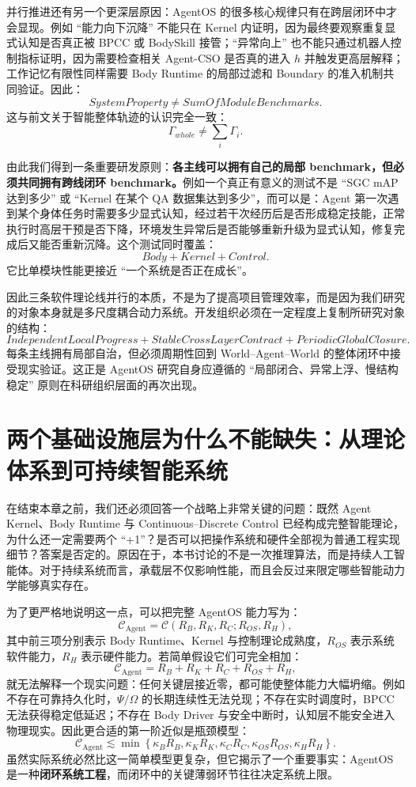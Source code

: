 并行推进还有另一个更深层原因：AgentOS 的很多核心规律只有在跨层闭环中才会显现。例如 ``能力向下沉降'' 不能只在 Kernel 内证明，因为最终要观察重复显式认知是否真正被 BPCC 或 BodySkill 接管；``异常向上'' 也不能只通过机器人控制指标证明，因为需要检查相关 Agent-CSO 是否真的进入 $h$ 并触发更高层解释；工作记忆有限性同样需要 Body Runtime 的局部过滤和 Boundary 的准入机制共同验证。因此：
\[
\boxed{
SystemProperty
\neq
SumOfModuleBenchmarks.
}
\]
这与前文关于智能整体轨迹的认识完全一致：
\[
\Gamma_{whole}
\neq
\sum_i \Gamma_i.
\]

由此我们得到一条重要研发原则：\textbf{各主线可以拥有自己的局部 benchmark，但必须共同拥有跨线闭环 benchmark。}例如一个真正有意义的测试不是 ``SGC mAP 达到多少'' 或 ``Kernel 在某个 QA 数据集达到多少''，而可以是：Agent 第一次遇到某个身体任务时需要多少显式认知，经过若干次经历后是否形成稳定技能，正常执行时高层干预是否下降，环境发生异常后是否能够重新升级为显式认知，修复完成后又能否重新沉降。这个测试同时覆盖：
\[
Body
+
Kernel
+
Control.
\]
它比单模块性能更接近 ``一个系统是否正在成长''。

因此三条软件理论线并行的本质，不是为了提高项目管理效率，而是因为我们研究的对象本身就是多尺度耦合动力系统。开发组织必须在一定程度上复制所研究对象的结构：
\[
\boxed{
IndependentLocalProgress
+
StableCrossLayerContract
+
PeriodicGlobalClosure.
}
\]
每条主线拥有局部自治，但必须周期性回到 World--Agent--World 的整体闭环中接受现实验证。这正是 AgentOS 研究自身应遵循的 ``局部闭合、异常上浮、慢结构稳定'' 原则在科研组织层面的再次出现。

\section{两个基础设施层为什么不能缺失：从理论体系到可持续智能系统}
\label{sec:roadmap-two-plus-one-necessity}

在结束本章之前，我们还必须回答一个战略上非常关键的问题：既然 Agent Kernel、Body Runtime 与 Continuous--Discrete Control 已经构成完整智能理论，为什么还一定需要两个 ``+1''？是否可以把操作系统和硬件全部视为普通工程实现细节？答案是否定的。原因在于，本书讨论的不是一次推理算法，而是持续人工智能体。对于持续系统而言，承载层不仅影响性能，而且会反过来限定哪些智能动力学能够真实存在。

为了更严格地说明这一点，可以把完整 AgentOS 能力写为：
\[
\mathcal C_{\mathrm{Agent}}
=
\mathcal C
\left(
R_B,
R_K,
R_C;
R_{OS},
R_H
\right),
\]
其中前三项分别表示 Body Runtime、Kernel 与控制理论成熟度，$R_{OS}$ 表示系统软件能力，$R_H$ 表示硬件能力。若简单假设它们可完全相加：
\[
\mathcal C_{\mathrm{Agent}}
=
R_B+R_K+R_C+R_{OS}+R_H,
\]
就无法解释一个现实问题：任何关键层接近零，都可能使整体能力大幅坍缩。例如不存在可靠持久化时，$\Psi/\Omega$ 的长期连续性无法兑现；不存在实时调度时，BPCC 无法获得稳定低延迟；不存在 Body Driver 与安全中断时，认知层不能安全进入物理现实。因此更合适的第一阶近似是瓶颈模型：
\[
\boxed{
\mathcal C_{\mathrm{Agent}}
\lesssim
\min
\left\{
\kappa_B R_B,
\kappa_K R_K,
\kappa_C R_C,
\kappa_{OS}R_{OS},
\kappa_HR_H
\right\}.
}
\]
虽然实际系统必然比这一简单模型更复杂，但它揭示了一个重要事实：AgentOS 是一种\textbf{闭环系统工程}，而闭环中的关键薄弱环节往往决定系统上限。

